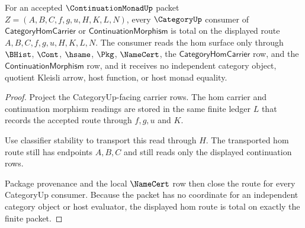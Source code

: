 \begin{theorem}
\label{thm:continuation-monad-category-hom-route-totality}
For an accepted $\ContinuationMonadUp$ packet
$Z=(A,B,C,f,g,u,H,K,L,N)$, every $\CategoryUp$ consumer of
$\mathsf{CategoryHomCarrier}$ or $\mathsf{ContinuationMorphism}$ is total on the
displayed route $A,B,C,f,g,u,H,K,L,N$. The consumer reads the hom surface only
through $\BHist$, $\Cont$, $\hsame$, $\Pkg$, $\NameCert$, the
$\mathsf{CategoryHomCarrier}$ row, and the $\mathsf{ContinuationMorphism}$ row,
and it receives no independent category object, quotient Kleisli arrow, host
function, or host monad equality.
\end{theorem}
\begin{proof}
Project the CategoryUp-facing carrier rows. The hom carrier and continuation
morphism readings are stored in the same finite ledger $L$ that records the
accepted route through $f,g,u$ and $K$.

Use classifier stability to transport this read through $H$. The transported
hom route still has endpoints $A,B,C$ and still reads only the displayed
continuation rows.

Package provenance and the local $\NameCert$ row then close the route for every
CategoryUp consumer. Because the packet has no coordinate for an independent
category object or host evaluator, the displayed hom route is total on exactly
the finite packet.
\end{proof}

